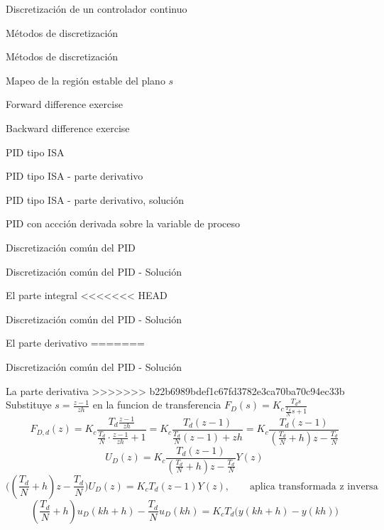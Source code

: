 \documentclass[presentation,aspectratio=1610]{beamer}
\begin{document}
\begin{frame}[label={sec:org86d23da}]{Discretización de un controlador continuo}
\begin{frame}[label={sec:org3ca2082}]{Métodos de discretización}
\begin{frame}[label={sec:orga78cff2}]{Métodos de discretización}
\begin{frame}[label={sec:org28bff53}]{Mapeo de la región estable del plano \(s\)}
\begin{frame}[label={sec:org9bb57fa}]{Forward difference exercise}
\begin{frame}[label={sec:orgaf8c1b0}]{Backward difference exercise}
\begin{frame}[label={sec:orgb2215e6}]{PID tipo ISA}
\begin{frame}[label={sec:orga06296a}]{PID tipo ISA - parte derivativo}
\begin{frame}[label={sec:org978e098}]{PID tipo ISA - parte derivativo, solución}
\begin{frame}[label={sec:orgf3b475b}]{PID con accción derivada sobre la variable de proceso}
\begin{frame}[label={sec:org5c3258e}]{Discretización común del PID}
\begin{frame}[label={sec:org95130b5}]{Discretización común del PID - Solución}
\begin{block}{El parte integral}
<<<<<<< HEAD
\begin{frame}[label={sec:org35f72c2}]{Discretización común del PID - Solución}
\begin{block}{El parte derivativo}
=======
\begin{frame}[label={sec:orgccbe19a}]{Discretización común del PID - Solución}
\begin{block}{La parte derivativa}
>>>>>>> b22b6989bdef1c67fd3782e3ca70ba70c94ec33b
Substituye \(s = \frac{z-1}{zh}\) en la funcion de transferencia \(F_D(s) = K_c \frac{T_d s}{\frac{T_d}{N} s + 1}\)
\[ F_{D,d}(z) = K_c\frac{T_d \frac{z-1}{zh}}{\frac{T_d}{N}\cdot\frac{z-1}{zh}+1} 
         = K_c \frac{T_d(z-1)}{\frac{T_d}{N}(z-1) + zh} 
= K_c \frac{T_d(z-1)}{(\frac{T_d}{N}+h)z -\frac{T_d}{N}} \]
\[ U_D(z) = K_c \frac{T_d(z-1)}{(\frac{T_d}{N}+h)z -\frac{T_d}{N}} Y(z)\]
\[ \Big((\frac{T_d}{N}+h)z -\frac{T_d}{N}\Big) U_D(z) = K_cT_d(z-1) Y(z), \qquad \text{aplica transformada z inversa} \]
\[ (\frac{T_d}{N}+h)u_D(kh+h) -\frac{T_d}{N}u_D(kh) = K_cT_d\big(y(kh+h) - y(kh)\big)\]
\end{block}
\end{frame}


\end{block}
\end{frame}
\end{block}
\end{frame}
\end{frame}
\end{frame}
\end{frame}
\end{frame}
\end{frame}
\end{frame}
\end{frame}
\end{frame}
\end{frame}
\end{frame}
\end{frame}
\end{document}
